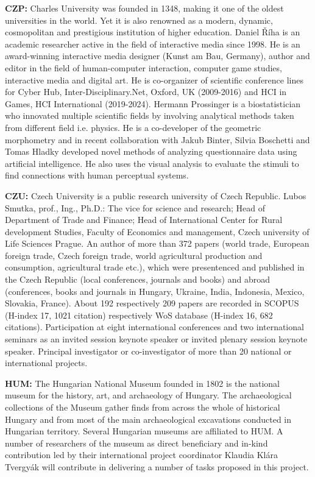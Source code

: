 \item \textbf{CZP:} Charles University was founded in 1348, making it one of the oldest universities in the world. Yet it is also renowned as a modern, dynamic, cosmopolitan and prestigious institution of higher education. Daniel Říha is an academic researcher active in the field of interactive media since 1998. He is an award-winning interactive media designer (Kunst am Bau, Germany), author and editor in the field of human-computer interaction, computer game studies, interactive media and digital art. He is co-organizer of scientific conference lines for Cyber Hub, Inter-Disciplinary.Net, Oxford, UK (2009-2016) and HCI in Games, HCI International (2019-2024). Hermann Prossinger is a biostatistician who innovated multiple scientific fields by involving analytical methods taken from different field i.e. physics. He is a co-developer of the geometric morphometry and in recent collaboration with Jakub Binter, Silvia Boschetti and Tomas Hladky developed novel methods of analyzing questionnaire data using artificial intelligence. He also uses the visual analysis to evaluate the stimuli to find connections with human perceptual systems.

\item \textbf{CZU:} Czech University is a public research university of Czech Republic. Lubos Smutka, prof., Ing., Ph.D.: The vice for science and research; Head of Department of Trade and Finance; Head of International Center for Rural development Studies, Faculty of Economics and management, Czech university of Life Sciences Prague. An author of more than 372 papers (world trade, European foreign trade, Czech foreign trade, world agricultural production and consumption, agricultural trade etc.), which were presentenced and published in the Czech Republic (local conferences, journals and books) and abroad (conferences, books and journals in Hungary, Ukraine, India, Indonesia, Mexico, Slovakia, France). About 192 respectively 209 papers are recorded in SCOPUS (H-index 17, 1021 citation) respectively WoS database (H-index 16, 682 citations). Participation at eight international conferences and two international seminars as an invited session keynote speaker or invited plenary session keynote speaker. Principal investigator or co-investigator of more than 20 national or international projects.

\item \textbf{HUM:} The Hungarian National Museum founded in 1802 is the national museum for the history, art, and archaeology of Hungary. The archaeological collections of the Museum gather finds from across the whole of historical Hungary and from most of the main archaeological excavations conducted in Hungarian territory. Several Hungarian museums are affiliated to HUM. A number of researchers of the museum as direct beneficiary and in-kind contribution led by their international project coordinator Klaudia Klára Tvergyák will contribute in delivering a number of tasks proposed in this project.

